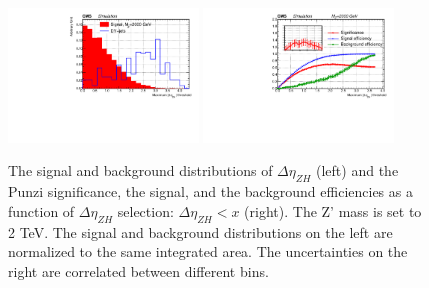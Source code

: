 \begin{figure}[htbp]
   \centering
   \includegraphics[width=0.45\textwidth]{optimization/plot_dEta/plot_dEta_input_in_Zprime_mass_2000.pdf}
   \includegraphics[width=0.45\textwidth]{optimization/plot_dEta/plot_dEta_Significance_and_efficiency_for_Zprme_M_2000.pdf}
   \caption{The signal and background distributions of $\Delta \eta_{ZH}$ 
(left) and the Punzi significance, the signal, and the background efficiencies as a 
function of $\Delta \eta_{ZH}$ selection: $\Delta \eta_{ZH} < x$ (right). The 
Z' mass is set to 2 TeV. The
   signal and background distributions on the left are normalized to the same
   integrated area. The uncertainties on the right are correlated between 
 different bins.}
   \label{fig:detatwo}
\end{figure}

